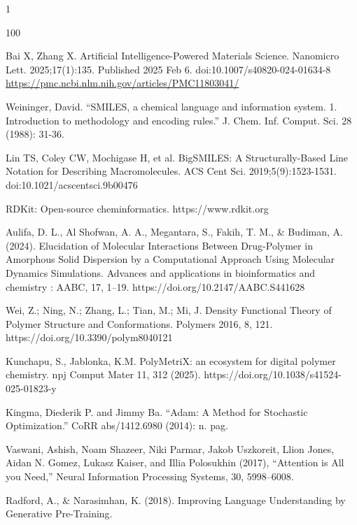 \begin{spacing}{1}
\begin{thebibliography}{100}


Bai X, Zhang X. Artificial Intelligence-Powered Materials Science. Nanomicro Lett. 2025;17(1):135. Published 2025 Feb 6. doi:10.1007/s40820-024-01634-8
\url{https://pmc.ncbi.nlm.nih.gov/articles/PMC11803041/}

Weininger, David. “SMILES, a chemical language and information system. 1. Introduction to methodology and encoding rules.” J. Chem. Inf. Comput. Sci. 28 (1988): 31-36.

Lin TS, Coley CW, Mochigase H, et al. BigSMILES: A Structurally-Based Line Notation for Describing Macromolecules. ACS Cent Sci. 2019;5(9):1523-1531. doi:10.1021/acscentsci.9b00476

RDKit: Open-source cheminformatics. https://www.rdkit.org

Aulifa, D. L., Al Shofwan, A. A., Megantara, S., Fakih, T. M., \& Budiman, A. (2024). Elucidation of Molecular Interactions Between Drug-Polymer in Amorphous Solid Dispersion by a Computational Approach Using Molecular Dynamics Simulations. Advances and applications in bioinformatics and chemistry : AABC, 17, 1–19. https://doi.org/10.2147/AABC.S441628

Wei, Z.; Ning, N.; Zhang, L.; Tian, M.; Mi, J. Density Functional Theory of Polymer Structure and Conformations. Polymers 2016, 8, 121. https://doi.org/10.3390/polym8040121 

Kunchapu, S., Jablonka, K.M. PolyMetriX: an ecosystem for digital polymer chemistry. npj Comput Mater 11, 312 (2025). https://doi.org/10.1038/s41524-025-01823-y

Kingma, Diederik P. and Jimmy Ba. “Adam: A Method for Stochastic Optimization.” CoRR abs/1412.6980 (2014): n. pag.

Vaswani, Ashish, Noam Shazeer, Niki Parmar, Jakob Uszkoreit, Llion Jones, Aidan N. Gomez, Lukasz Kaiser, and Illia Polosukhin (2017), “Attention is All you Need,” Neural Information Processing Systems, 30, 5998–6008.

Radford, A., \& Narasimhan, K. (2018). Improving Language Understanding by Generative Pre-Training.






\end{thebibliography}
\end{spacing}


